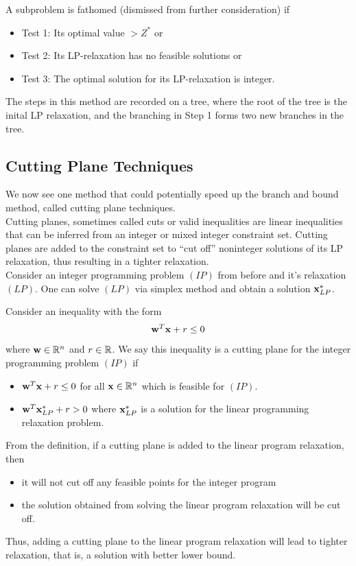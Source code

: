 A subproblem is fathomed (dismissed from further consideration) if
\begin{itemize}
    \item Test 1: Its optimal value \(> Z^*\) or
    \item Test 2: Its LP-relaxation has no feasible solutions or
    \item Test 3: The optimal solution for its LP-relaxation is integer.
\end{itemize}

The steps in this method are recorded on a tree, where the root of the tree is the inital LP relaxation, and the branching in Step 1 forms two new branches in the tree.

\subsection{Cutting Plane Techniques}
We now see one method that could potentially speed up the branch and bound method, called cutting plane techniques. \\

Cutting planes, sometimes called cuts or valid inequalities are linear inequalities that can be inferred from an integer or mixed integer constraint set. Cutting planes are added to the constraint set to ``cut off'' noninteger solutions of its LP relaxation, thus resulting in a tighter relaxation. \\

Consider an integer programming problem \((IP)\) from before and it's relaxation \((LP)\). One can solve \((LP)\) via simplex method and obtain a solution \(\mathbf{x}_{LP}^*\).

\begin{definition}
    Consider an inequality with the form
    \[\mathbf{w}^T \mathbf{x} + r \leq 0\]
    where \(\mathbf{w} \in \mathbb{R}^n\) and \(r \in \mathbb{R}\). We say this inequality is a cutting plane for the integer programming problem \((IP)\) if
    \begin{itemize}
        \item \(\mathbf{w}^T\mathbf{x} + r \leq 0\) for all \(\mathbf{x} \in \mathbb{R}^n\) which is feasible for \((IP)\).
        \item \(\mathbf{w}^T \mathbf{x}_{LP}^* + r > 0\) where \(\mathbf{x}_{LP}^*\) is a solution for the linear programming relaxation problem.
    \end{itemize}
\end{definition}

From the definition, if a cutting plane is added to the linear program relaxation, then
\begin{itemize}
    \item it will not cut off any feasible points for the integer program
    \item the solution obtained from solving the linear program relaxation will be cut off.
\end{itemize}

Thus, adding a cutting plane to the linear program relaxation will lead to tighter relaxation, that is, a solution with better lower bound.